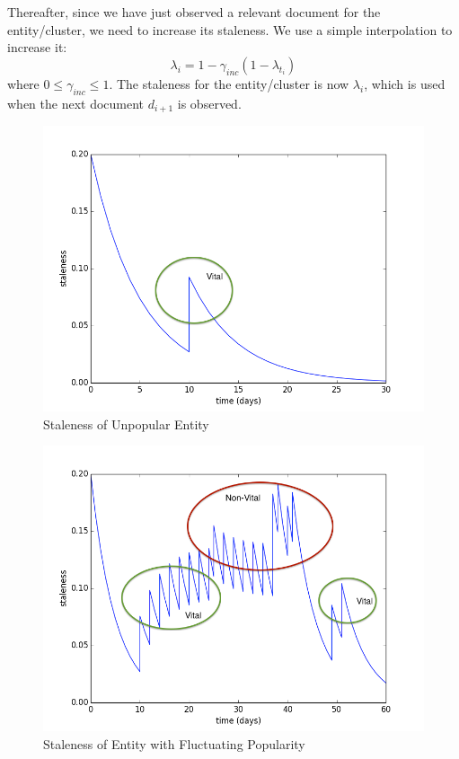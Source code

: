 \documentclass{article}
\begin{document}
Thereafter, since we have just observed a relevant document for the entity/cluster, we need to increase its staleness. 
We use a simple interpolation to increase it:%
\begin{equation}
\lambda_i = 1 - \gamma_{inc}(1 - \lambda_{t_i})
\end{equation}
where $0 \leq \gamma_{inc} \leq 1$.
The staleness for the entity/cluster is now $\lambda_i$, which is used when the next document $d_{i+1}$ is observed.

\begin{figure}[tb]
\centering
\includegraphics[width=0.7\columnwidth]{fig/staleness1.png}
\caption{Staleness of Unpopular Entity}
\label{stalenesslow}
\end{figure}

\begin{figure}[tb]
\centering
\includegraphics[width=0.7\columnwidth]{fig/staleness2.png}
\caption{Staleness of Entity with Fluctuating Popularity}
\label{stalenessmedium}
\end{figure}
\end{document}
